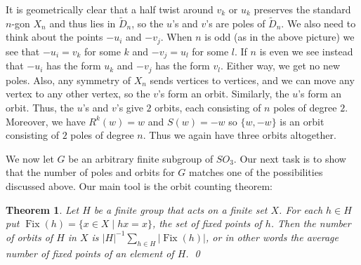 \documentclass{amsart}
\DeclareMathOperator{\Fix}      {Fix}
\newcommand{\st}        {\;|\;}
\newcommand{\tD}        {\widetilde{D}}
\renewcommand{\:}{\colon}
\newtheorem{theorem}{Theorem}[section]
\theoremstyle{definition}
\begin{document}
\begin{itemize}
\begin{center}
\begin{tikzpicture}[scale=2]
    \end{tikzpicture} 
  \end{center}
  It is geometrically clear that a half twist around $v_k$ or $u_k$
  preserves the standard $n$-gon $X_n$ and thus lies in $\tD_n$, so
  the $u$'s and $v$'s are poles of $\tD_n$.  We also need to think
  about the points $-u_i$ and $-v_j$.  When $n$ is odd (as in the
  above picture) we see that $-u_i=v_k$ for some $k$ and $-v_j=u_l$
  for some $l$.  If $n$ is even we see instead that $-u_i$ has the
  form $u_k$ and $-v_j$ has the form $v_l$.  Either way, we get no new
  poles.  Also, any symmetry of $X_n$ sends vertices to vertices, and
  we can move any vertex to any other vertex, so the $v$'s form an
  orbit.  Similarly, the $u$'s form an orbit.  Thus, the $u$'s and
  $v$'s give $2$ orbits, each consisting of $n$ poles of degree $2$.
  Moreover, we have $R^k(w)=w$ and $S(w)=-w$ so $\{w,-w\}$ is an orbit
  consisting of $2$ poles of degree $n$.  Thus we again have three
  orbits altogether.
\end{itemize}

We now let $G$ be an arbitrary finite subgroup of $SO_3$.  Our next
task is to show that the number of poles and orbits for $G$ matches
one of the possibilities discussed above.  Our main tool is the orbit
counting theorem:
\begin{theorem}
 Let $H$ be a finite group that acts on a finite set $X$.  For each
 $h\in H$ put $\Fix(h)=\{x\in X\st hx=x\}$, the set of fixed points of
 $h$.  Then the number of orbits of $H$ in $X$ is
 $|H|^{-1}\sum_{h\in H}|\Fix(h)|$, or in other words the average
 number of fixed points of an element of $H$. \qed
\end{theorem}
\end{document}
